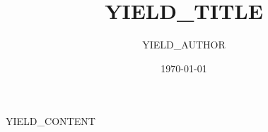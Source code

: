 \documentclass[12pt]{article}
\title{YIELD_TITLE}
\date{\today}
\author{YIELD_AUTHOR}
\begin{document}
  \maketitle
  
  YIELD_CONTENT
\end{document}
